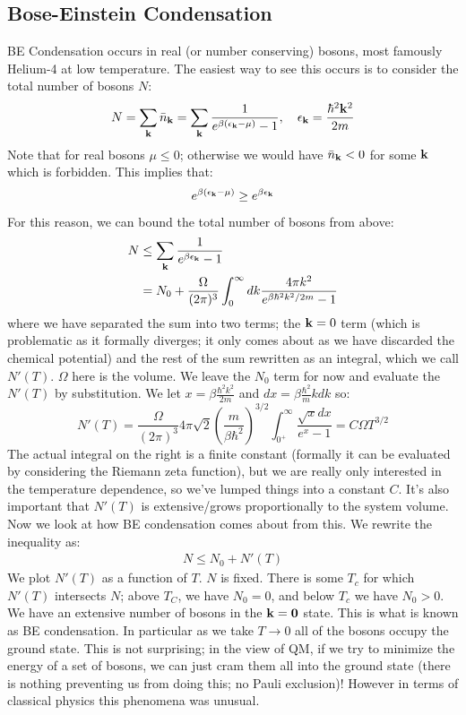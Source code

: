 \subsection{Bose-Einstein Condensation}
BE Condensation occurs in real (or number conserving) bosons, most famously Helium-4 at low temperature. The easiest way to see this occurs is to consider the total number of bosons $N$:
\begin{equation}
    N = \sum_{\mathbf{k}}\bar{n}_{\mathbf{k}} = \sum_{\mathbf{k}}  \frac{1}{e^{\beta(\epsilon_{\mathbf{k}} - \mu)} - 1}, \quad \epsilon_{\mathbf{k}} = \frac{\hbar^2\mathbf{k}^2}{2m}
\end{equation}
Note that for real bosons $\mu \leq 0$; otherwise we would have $\bar{n}_{\mathbf{k}} < 0$ for some $\mathbf{k}$ which is forbidden. This implies that:
\begin{align*}
    e^{\beta(\epsilon_{\mathbf{k}} - \mu)} \geq e^{\beta\epsilon_{\mathbf{k}}}
\end{align*}
For this reason, we can bound the total number of bosons from above:
\begin{equation}
    \begin{split}
        N &\leq \sum_{\mathbf{k}}\frac{1}{e^{\beta \epsilon_{\mathbf{k}}} - 1}
        \\ &= N_0 + \frac{\Omega}{(2\pi)^3}\int_0^\infty dk \frac{4\pi k^2}{e^{\beta\hbar^2k^2/2m} - 1}
    \end{split}
\end{equation}
where we have separated the sum into two terms; the $\mathbf{k} = 0$ term (which is problematic as it formally diverges; it only comes about as we have discarded the chemical potential) and the rest of the sum rewritten as an integral, which we call $N'(T)$. $\Omega$ here is the volume. We leave the $N_0$ term for now and evaluate the $N'(T)$ by substitution. We let $x = \beta\frac{\hbar^2k^2}{2m}$ and $dx = \beta\frac{\hbar^2}{m}kdk$ so:
\begin{equation}
    N'(T) = \frac{\Omega}{(2\pi)^3}4\pi \sqrt{2}\left(\frac{m}{\beta\hbar^2}\right)^{3/2}\int_{0^+}^\infty \frac{\sqrt{x}dx}{e^x - 1} = C\Omega T^{3/2}
\end{equation}
The actual integral on the right is a finite constant (formally it can be evaluated by considering the Riemann zeta function), but we are really only interested in the temperature dependence, so we've lumped things into a constant $C$. It's also important that $N'(T)$ is extensive/grows proportionally to the system volume. Now we look at how BE condensation comes about from this. We rewrite the inequality as:
\begin{align*}
    N \leq N_0 + N'(T)
\end{align*}
We plot $N'(T)$ as a function of $T$. $N$ is fixed. There is some $T_c$ for which $N'(T)$ intersects $N$; above $T_C$, we have $N_0 = 0$, and below $T_c$ we have $N_0 > 0$. We have an extensive number of bosons in the $\mathbf{k} = \mathbf{0}$ state. This is what is known as BE condensation. In particular as we take $T \to 0$ all of the bosons occupy the ground state. This is not surprising; in the view of QM, if we try to minimize the energy of a set of bosons, we can just cram them all into the ground state (there is nothing preventing us from doing this; no Pauli exclusion)! However in terms of classical physics this phenomena was unusual.

